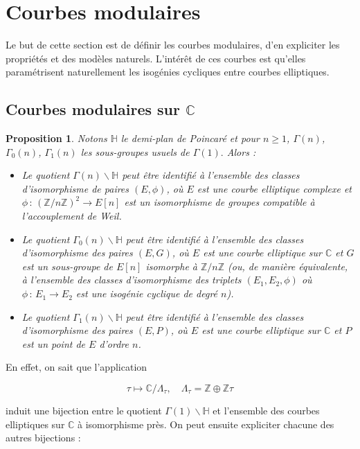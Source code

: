 \documentclass[11pt,a4paper]{article}
\newcommand{\Z}{\mathbb{Z}}
\newcommand{\C}{\mathbb{C}}
\renewcommand{\H}{\mathbb{H}}
\renewcommand{\b}{\backslash}
\newcommand{\vers}{\rightarrow}
\newcommand{\de}{\,:\,}
\newtheorem*{prop}{Proposition}
\theoremstyle{definition}
\begin{document}
\newpage

\section{Courbes modulaires}


Le but de cette section est de définir les courbes modulaires, d'en expliciter les propriétés et des modèles naturels. L'intérêt de ces courbes est qu'elles paramétrisent naturellement les isogénies cycliques entre courbes elliptiques.



\subsection{Courbes modulaires sur $\C$}

\begin{prop}

Notons $\H$ le demi-plan de Poincaré et pour $n\geq 1$, $\Gamma(n)$, $\Gamma_0(n)$, $\Gamma_1(n)$ les sous-groupes usuels de $\Gamma(1).$ Alors :

\begin{itemize}
\item Le quotient $\Gamma(n)\b \H$ peut être identifié à l'ensemble des classes d'isomorphisme de paires $(E,\phi)$, où $E$ est une courbe elliptique complexe et $\phi\de (\Z/n\Z)^2\vers E[n]$ est un isomorphisme de groupes compatible à l'accouplement de Weil.
\item Le quotient $\Gamma_0(n)\b \H$ peut être identifié à l'ensemble des classes d'isomorphisme des paires $(E,G)$, où $E$ est une courbe elliptique sur $\C$ et $G$ est un sous-groupe de $E[n]$ isomorphe à $\Z/n\Z$ (ou, de manière équivalente, à l'ensemble des classes d'isomorphisme des triplets $(E_1, E_2, \phi)$ où $\phi\de E_1\vers E_2$ est une isogénie cyclique de degré $n$).
\item Le quotient $\Gamma_1(n)\b \H$ peut être identifié à l'ensemble des classes d'isomorphisme des paires $(E,P)$, où $E$ est une courbe elliptique sur $\C$ et $P$ est un point de $E$ d'ordre $n$.
\end{itemize}

\end{prop}

En effet, on sait que l'application

$$\tau \longmapsto \C/\Lambda_\tau,\quad \Lambda_\tau = \Z \oplus \Z\tau$$

induit une bijection entre le quotient $\Gamma(1)\b \H$ et l'ensemble des courbes elliptiques sur $\C$ à isomorphisme près. On peut ensuite expliciter chacune des autres bijections :
\end{document}
